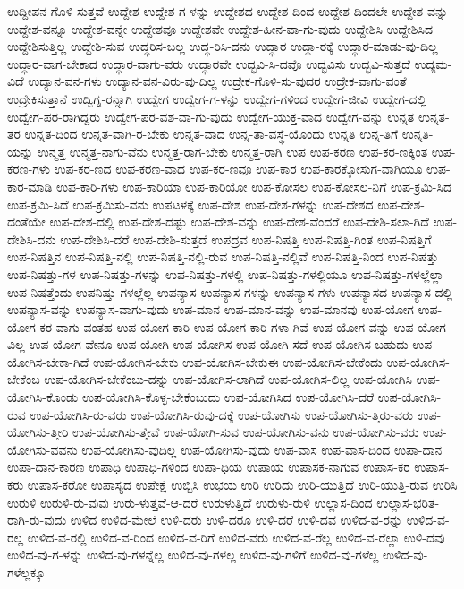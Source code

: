 {ಉದ್ದೀಪನ-ಗೊಳಿ-ಸುತ್ತವೆ
ಉದ್ದೇಶ
ಉದ್ದೇಶ-ಗ-ಳನ್ನು
ಉದ್ದೇಶದ
ಉದ್ದೇಶ-ದಿಂದ
ಉದ್ದೇಶ-ದಿಂದಲೇ
ಉದ್ದೇಶ-ವನ್ನು
ಉದ್ದೇಶ-ವನ್ನೂ
ಉದ್ದೇಶ-ವನ್ನೇ
ಉದ್ದೇಶವೂ
ಉದ್ದೇಶವೇ
ಉದ್ದೇಶ-ಹೀನ-ವಾ-ಗು-ವುದು
ಉದ್ದೇಶಿಸಿ
ಉದ್ದೇಶಿಸಿದ
ಉದ್ದೇಶಿಸುತ್ತಿಲ್ಲ
ಉದ್ದೇಶಿ-ಸುವ
ಉದ್ಧರಿಸ-ಬಲ್ಲ
ಉದ್ಧ-ರಿಸಿ-ದನು
ಉದ್ಧಾರ
ಉದ್ಧಾ-ರಕ್ಕೆ
ಉದ್ಧಾರ-ಮಾಡು-ವು-ದಿಲ್ಲ
ಉದ್ಧಾರ-ವಾಗ-ಬೇಕಾದ
ಉದ್ಧಾರ-ವಾಗು-ವರು
ಉದ್ಧಾರವೇ
ಉದ್ಭವಿ-ಸಿ-ದವೊ
ಉದ್ಭವಿಸು
ಉದ್ಭವಿ-ಸುತ್ತದೆ
ಉದ್ಯಮ-ವಿದೆ
ಉದ್ಯಾನ-ವನ-ಗಳು
ಉದ್ಯಾನ-ವನ-ವಿರು-ವು-ದಿಲ್ಲ
ಉದ್ರೇಕ-ಗೊಳಿ-ಸು-ವುದರ
ಉದ್ರೇಕ-ವಾಗು-ವಂತೆ
ಉದ್ರೇಕಿಸುತ್ತಾನೆ
ಉದ್ವಿಗ್ನ-ರನ್ನಾಗಿ
ಉದ್ವೇಗ
ಉದ್ವೇಗ-ಗ-ಳನ್ನು
ಉದ್ವೇಗ-ಗಳಿಂದ
ಉದ್ವೇಗ-ಜೀವಿ
ಉದ್ವೇಗ-ದಲ್ಲಿ
ಉದ್ವೇಗ-ಪರ-ರಾಗಿದ್ದರು
ಉದ್ವೇಗ-ಪರ-ವಶ-ವಾ-ಗು-ವುದು
ಉದ್ವೇಗ-ಯುಕ್ತ-ವಾದ
ಉದ್ವೇಗ-ವನ್ನು
ಉನ್ನತ
ಉನ್ನತ-ತರ
ಉನ್ನತ-ದಿಂದ
ಉನ್ನತ-ವಾಗಿ-ರ-ಬೇಕು
ಉನ್ನತ-ವಾದ
ಉನ್ನ-ತಾ-ವಸ್ಥೆ-ಯೊಂದು
ಉನ್ನತಿ
ಉನ್ನ-ತಿಗೆ
ಉನ್ನತಿ-ಯನ್ನು
ಉನ್ಮತ್ತ
ಉನ್ಮತ್ತ-ನಾಗು-ವೆನು
ಉನ್ಮತ್ತ-ರಾಗ-ಬೇಕು
ಉನ್ಮತ್ತ-ರಾಗಿ
ಉಪ
ಉಪ-ಕರಣ
ಉಪ-ಕರ-ಣಕ್ಕಿಂತ
ಉಪ-ಕರಣ-ಗಳು
ಉಪ-ಕರ-ಣದ
ಉಪ-ಕರಣ-ವಾದ
ಉಪ-ಕರ-ಣವೂ
ಉಪ-ಕಾರ
ಉಪ-ಕಾರಕ್ಕೋಸುಗ-ವಾಗಿಯೂ
ಉಪ-ಕಾರ-ಮಾಡಿ
ಉಪ-ಕಾರಿ-ಗಳು
ಉಪ-ಕಾರಿಯಾ
ಉಪ-ಕಾರಿಯೋ
ಉಪ-ಕೋಸಲ
ಉಪ-ಕೋಸಲ-ನಿಗೆ
ಉಪ-ಕ್ರಮಿ-ಸಿದ
ಉಪ-ಕ್ರಮಿ-ಸಿದೆ
ಉಪ-ಕ್ರಮಿಸು-ವನು
ಉಪಟಳಕ್ಕೆ
ಉಪ-ದೇಶ
ಉಪ-ದೇಶ-ಗಳನ್ನು
ಉಪ-ದೇಶದ
ಉಪ-ದೇಶ-ದಂತೆಯೇ
ಉಪ-ದೇಶ-ದಲ್ಲಿ
ಉಪ-ದೇಶ-ದಷ್ಟು
ಉಪ-ದೇಶ-ವನ್ನು
ಉಪ-ದೇಶ-ವೆಂದರೆ
ಉಪ-ದೇಶಿ-ಸಲಾ-ಗಿದೆ
ಉಪ-ದೇಶಿಸಿ-ದನು
ಉಪ-ದೇಶಿಸಿ-ದರೆ
ಉಪ-ದೇಶಿ-ಸುತ್ತದೆ
ಉಪದ್ರವ
ಉಪ-ನಿಷತ್ತಿ
ಉಪ-ನಿಷತ್ತಿ-ಗಿಂತ
ಉಪ-ನಿಷತ್ತಿಗೆ
ಉಪ-ನಿಷತ್ತಿನ
ಉಪ-ನಿಷತ್ತಿ-ನಲ್ಲಿ
ಉಪ-ನಿಷತ್ತಿ-ನಲ್ಲಿ-ರುವ
ಉಪ-ನಿಷತ್ತಿ-ನಲ್ಲಿವೆ
ಉಪ-ನಿಷತ್ತಿ-ನಿಂದ
ಉಪ-ನಿಷತ್ತು
ಉಪ-ನಿಷತ್ತು-ಗಳ
ಉಪ-ನಿಷತ್ತು-ಗಳನ್ನು
ಉಪ-ನಿಷತ್ತು-ಗಳಲ್ಲಿ
ಉಪ-ನಿಷತ್ತು-ಗಳಲ್ಲಿಯೂ
ಉಪ-ನಿಷತ್ತು-ಗಳಲ್ಲೆಲ್ಲಾ
ಉಪ-ನಿಷತ್ತೆಂದು
ಉಪನಿಷ್ತು-ಗಳಲ್ಲೆಲ್ಲ
ಉಪನ್ಯಾಸ
ಉಪನ್ಯಾಸ-ಗಳನ್ನು
ಉಪನ್ಯಾಸ-ಗಳು
ಉಪನ್ಯಾಸದ
ಉಪನ್ಯಾಸ-ದಲ್ಲಿ
ಉಪನ್ಯಾಸ-ವನ್ನು
ಉಪನ್ಯಾಸ-ವಾಗು-ವುದು
ಉಪ-ಮಾನ
ಉಪ-ಮಾನ-ವನ್ನು
ಉಪ-ಮಾನವು
ಉಪ-ಯೋಗ
ಉಪ-ಯೋಗ-ಕರ-ವಾಗು-ವಂತಹ
ಉಪ-ಯೋಗ-ಕಾರಿ
ಉಪ-ಯೋಗ-ಕಾರಿ-ಗಳಾ-ಗಿವೆ
ಉಪ-ಯೋಗ-ವನ್ನು
ಉಪ-ಯೋಗ-ವಿಲ್ಲ
ಉಪ-ಯೋಗ-ವೇನೂ
ಉಪ-ಯೋಗಿ
ಉಪ-ಯೋಗಿಸ
ಉಪ-ಯೋಗಿ-ಸದೆ
ಉಪ-ಯೋಗಿಸ-ಬಹುದು
ಉಪ-ಯೋಗಿಸ-ಬೇಕಾ-ಗಿದೆ
ಉಪ-ಯೋಗಿಸ-ಬೇಕು
ಉಪ-ಯೋಗಿಸ-ಬೇಕುಈ
ಉಪ-ಯೋಗಿಸ-ಬೇಕೆಂದು
ಉಪ-ಯೋಗಿಸ-ಬೇಕೆಂಬ
ಉಪ-ಯೋಗಿಸ-ಬೇಕೆಂಬು-ದನ್ನು
ಉಪ-ಯೋಗಿಸ-ಲಾಗಿದೆ
ಉಪ-ಯೋಗಿಸ-ಲಿಲ್ಲ
ಉಪ-ಯೋಗಿಸಿ
ಉಪ-ಯೋಗಿಸಿ-ಕೊಂಡು
ಉಪ-ಯೋಗಿಸಿ-ಕೊಳ್ಳ-ಬೇಕೆಂಬುದು
ಉಪ-ಯೋಗಿಸಿದ
ಉಪ-ಯೋಗಿಸಿ-ದರೆ
ಉಪ-ಯೋಗಿಸಿ-ರುವ
ಉಪ-ಯೋಗಿಸಿ-ರು-ವರು
ಉಪ-ಯೋಗಿಸಿ-ರುವು-ದಕ್ಕೆ
ಉಪ-ಯೋಗಿಸು
ಉಪ-ಯೋಗಿಸು-ತ್ತಿರು-ವರು
ಉಪ-ಯೋಗಿಸು-ತ್ತೀರಿ
ಉಪ-ಯೋಗಿಸು-ತ್ತೇವೆ
ಉಪ-ಯೋಗಿ-ಸುವ
ಉಪ-ಯೋಗಿಸು-ವನು
ಉಪ-ಯೋಗಿಸು-ವರು
ಉಪ-ಯೋಗಿಸು-ವವನು
ಉಪ-ಯೋಗಿಸು-ವುದಿಲ್ಲ
ಉಪ-ಯೋಗಿಸು-ವುದು
ಉಪ-ವಾಸ
ಉಪ-ವಾಸ-ದಿಂದ
ಉಪಾ-ದಾನ
ಉಪಾ-ದಾನ-ಕಾರಣ
ಉಪಾಧಿ
ಉಪಾಧಿ-ಗಳಿಂದ
ಉಪಾ-ಧಿಯ
ಉಪಾಯ
ಉಪಾಸಕ-ನಾಗುವ
ಉಪಾಸ-ಕರ
ಉಪಾಸ-ಕರು
ಉಪಾಸ-ಕರೋ
ಉಪಾಸ್ಯದ
ಉಪೇಕ್ಷೆ
ಉಬ್ಬಿಸಿ
ಉಭಯ
ಉರಿ
ಉರಿದು
ಉರಿ-ಯುತ್ತಿದೆ
ಉರಿ-ಯುತ್ತಿ-ರುವ
ಉರಿಸಿ
ಉರುಳಿ
ಉರುಳಿ-ರು-ವುವು
ಉರು-ಳುತ್ತವೆ-ಆ-ದರೆ
ಉರುಳುತ್ತಿದೆ
ಉರುಳು-ರುಳಿ
ಉಲ್ಲಾಸ-ದಿಂದ
ಉಲ್ಲಾಸ-ಭರಿತ-ರಾಗಿ-ರು-ವುದು
ಉಳಿದ
ಉಳಿದ-ಮೇಲೆ
ಉಳಿ-ದರು
ಉಳಿ-ದರೂ
ಉಳಿ-ದರೆ
ಉಳಿ-ದವ
ಉಳಿದ-ವ-ರನ್ನು
ಉಳಿದ-ವ-ರಲ್ಲ
ಉಳಿದ-ವ-ರಲ್ಲಿ
ಉಳಿದ-ವ-ರಿಂದ
ಉಳಿದ-ವ-ರಿಗೆ
ಉಳಿದ-ವರು
ಉಳಿದ-ವ-ರೆಲ್ಲ
ಉಳಿದ-ವ-ರೆಲ್ಲಾ
ಉಳಿ-ದವು
ಉಳಿದ-ವು-ಗ-ಳನ್ನು
ಉಳಿದ-ವು-ಗಳನ್ನೆಲ್ಲ
ಉಳಿದ-ವು-ಗಳಲ್ಲ
ಉಳಿದ-ವು-ಗಳಿಗೆ
ಉಳಿದ-ವು-ಗಳೆಲ್ಲ
ಉಳಿದ-ವು-ಗಳೆಲ್ಲಕ್ಕೂ
}
